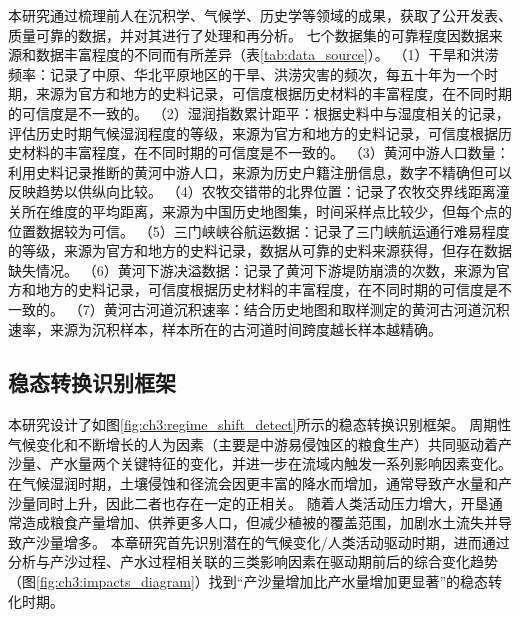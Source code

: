 本研究通过梳理前人在沉积学、气候学、历史学等领域的成果，获取了公开发表、质量可靠的数据，并对其进行了处理和再分析。
七个数据集的可靠程度因数据来源和数据丰富程度的不同而有所差异（表\ref{tab:data_source}）。
（1）干旱和洪涝频率：记录了中原、华北平原地区的干旱、洪涝灾害的频次，每五十年为一个时期，来源为官方和地方的史料记录，可信度根据历史材料的丰富程度，在不同时期的可信度是不一致的。
（2）湿润指数累计距平：根据史料中与湿度相关的记录，评估历史时期气候湿润程度的等级，来源为官方和地方的史料记录，可信度根据历史材料的丰富程度，在不同时期的可信度是不一致的。
（3）黄河中游人口数量：利用史料记录推断的黄河中游人口，来源为历史户籍注册信息，数字不精确但可以反映趋势以供纵向比较。
（4）农牧交错带的北界位置：记录了农牧交界线距离潼关所在维度的平均距离，来源为中国历史地图集，时间采样点比较少，但每个点的位置数据较为可信。
（5）三门峡峡谷航运数据：记录了三门峡航运通行难易程度的等级，来源为官方和地方的史料记录，数据从可靠的史料来源获得，但存在数据缺失情况。
（6）黄河下游决溢数据：记录了黄河下游堤防崩溃的次数，来源为官方和地方的史料记录，可信度根据历史材料的丰富程度，在不同时期的可信度是不一致的。
（7）黄河古河道沉积速率：结合历史地图和取样测定的黄河古河道沉积速率，来源为沉积样本，样本所在的古河道时间跨度越长样本越精确。




\subsection{稳态转换识别框架}\label{sec:ch3:approach}

本研究设计了如图\ref{fig:ch3:regime_shift_detect}所示的稳态转换识别框架。
周期性气候变化和不断增长的人为因素（主要是中游易侵蚀区的粮食生产）共同驱动着产沙量、产水量两个关键特征的变化，并进一步在流域内触发一系列影响因素变化。
在气候湿润时期，土壤侵蚀和径流会因更丰富的降水而增加，通常导致产水量和产沙量同时上升，因此二者也存在一定的正相关\cite{GeQuanSheng2011}。
随着人类活动压力增大，开垦通常造成粮食产量增加、供养更多人口，但减少植被的覆盖范围，加剧水土流失并导致产沙量增多\cite{wu2020a}。
本章研究首先识别潜在的气候变化/人类活动驱动时期，进而通过分析与产沙过程、产水过程相关联的三类影响因素在驱动期前后的综合变化趋势（图\ref{fig:ch3:impacts_diagram}）找到“产沙量增加比产水量增加更显著”的稳态转化时期。

